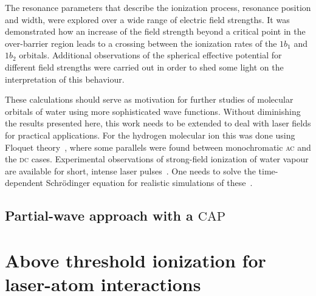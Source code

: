 The resonance parameters that describe the ionization process,
resonance position and width, were explored over a wide range of
electric field strengths. It was demonstrated how an increase of the
field strength beyond a critical point in the over-barrier region
leads to a crossing between the ionization rates of the $1b_{1}$ and
$1b_{2}$ orbitals. Additional observations of the spherical effective
potential for different field strengths were carried out in order to
shed some light on the interpretation of this behaviour.


These calculations should serve as motivation for further studies of
molecular orbitals of water using more sophisticated wave
functions. Without diminishing the results presented here, this work
needs to be extended to deal with laser fields for practical
applications. For the hydrogen molecular ion this was done using
Floquet theory~\cite{Tsog_H2mol_ac_2013}, where some parallels were
found between monochromatic \textsc{ac} and the \textsc{dc}
cases. Experimental observations of strong-field ionization of water
vapour are available for short, intense laser
pulses~\cite{exp_h2o_laser_2008,exp_h2o_laser_2014}. One needs to
solve the time-dependent Schr\"{o}dinger equation for realistic
simulations of these~\cite{Farrell_2011,Falge_2010}.


\subsection{Partial-wave approach with a $\mathrm{CAP}$}




\section{Above threshold ionization for laser-atom interactions}
\label{ch:ati_results}


























































